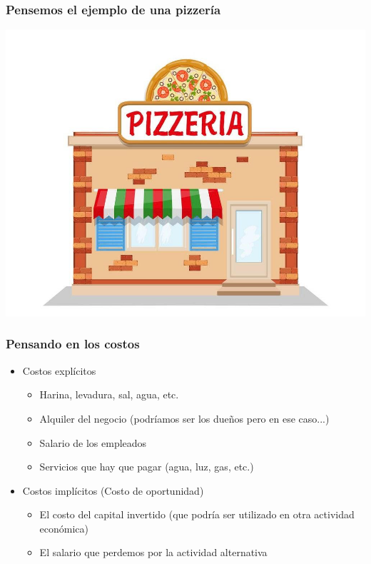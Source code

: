 \documentclass{beamer}
\begin{document}
\begin{frame}
\frametitle{Pensemos el ejemplo de una pizzería}
\centering
\includegraphics[scale=0.25]{../Figures/pizzeria.jpeg}
\end{frame}
        
\begin{frame}
    \frametitle{Pensando en los costos}
    \begin{itemize}
        \item Costos explícitos
        \begin{itemize}
            \item Harina, levadura, sal, agua, etc.
            \item Alquiler del negocio (podríamos ser los dueños pero en ese caso...)
            \item Salario de los empleados 
            \item Servicios que hay que pagar (agua, luz, gas, etc.)
        \end{itemize}
        \item Costos implícitos (Costo de oportunidad)
        \begin{itemize}
            \item El costo del capital invertido (que podría ser utilizado en otra actividad económica)
            \item El salario que perdemos por la actividad alternativa
        \end{itemize}
    \end{itemize}
\end{frame}
\end{document}

